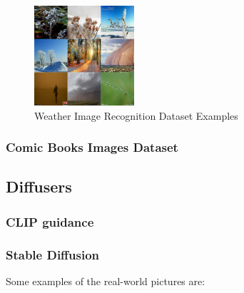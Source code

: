 \documentclass[11pt]{article}
\begin{document}
\begin{figure}[h]
  \centering
  \includegraphics[width=140]{./assets/paper_weather_dataset.jpg}
  \caption{Weather Image Recognition Dataset Examples}
  \label{fig:paper_weather_dataset}
\end{figure}

\subsubsection{Comic Books Images Dataset}

\subsection{Diffusers}

\subsubsection{CLIP guidance}

\subsubsection{Stable Diffusion}


Some examples of the real-world pictures are:

\begin{figure}[htbp]
\centering
{}%
\ \  \ \  \ \  \ \
%
\end{figure}
\end{document}
